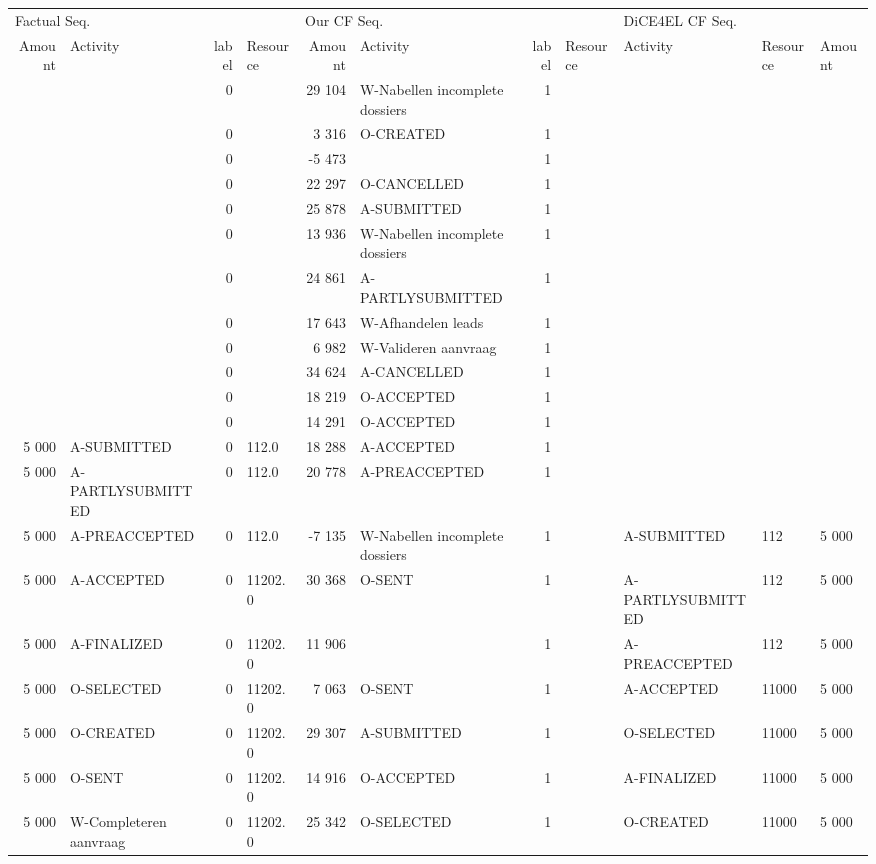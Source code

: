 \begin{tabular}{rlrlrlrllll}
\toprule
\multicolumn{4}{l}{Factual Seq.} & \multicolumn{4}{l}{Our CF Seq.} & \multicolumn{3}{l}{DiCE4EL CF Seq.} \\
Amount & Activity & label & Resource & Amount & Activity & label & Resource & Activity & Resource & Amount \\
\midrule
 &  & 0 &  & 29 104 & W-Nabellen incomplete dossiers & 1 &  &  &  &  \\
 &  & 0 &  & 3 316 & O-CREATED & 1 &  &  &  &  \\
 &  & 0 &  & -5 473 &  & 1 &  &  &  &  \\
 &  & 0 &  & 22 297 & O-CANCELLED & 1 &  &  &  &  \\
 &  & 0 &  & 25 878 & A-SUBMITTED & 1 &  &  &  &  \\
 &  & 0 &  & 13 936 & W-Nabellen incomplete dossiers & 1 &  &  &  &  \\
 &  & 0 &  & 24 861 & A-PARTLYSUBMITTED & 1 &  &  &  &  \\
 &  & 0 &  & 17 643 & W-Afhandelen leads & 1 &  &  &  &  \\
 &  & 0 &  & 6 982 & W-Valideren aanvraag & 1 &  &  &  &  \\
 &  & 0 &  & 34 624 & A-CANCELLED & 1 &  &  &  &  \\
 &  & 0 &  & 18 219 & O-ACCEPTED & 1 &  &  &  &  \\
 &  & 0 &  & 14 291 & O-ACCEPTED & 1 &  &  &  &  \\
5 000 & A-SUBMITTED & 0 & 112.0 & 18 288 & A-ACCEPTED & 1 &  &  &  &  \\
5 000 & A-PARTLYSUBMITTED & 0 & 112.0 & 20 778 & A-PREACCEPTED & 1 &  &  &  &  \\
5 000 & A-PREACCEPTED & 0 & 112.0 & -7 135 & W-Nabellen incomplete dossiers & 1 &  & A-SUBMITTED & 112 & 5 000 \\
5 000 & A-ACCEPTED & 0 & 11202.0 & 30 368 & O-SENT & 1 &  & A-PARTLYSUBMITTED & 112 & 5 000 \\
5 000 & A-FINALIZED & 0 & 11202.0 & 11 906 &  & 1 &  & A-PREACCEPTED & 112 & 5 000 \\
5 000 & O-SELECTED & 0 & 11202.0 & 7 063 & O-SENT & 1 &  & A-ACCEPTED & 11000 & 5 000 \\
5 000 & O-CREATED & 0 & 11202.0 & 29 307 & A-SUBMITTED & 1 &  & O-SELECTED & 11000 & 5 000 \\
5 000 & O-SENT & 0 & 11202.0 & 14 916 & O-ACCEPTED & 1 &  & A-FINALIZED & 11000 & 5 000 \\
5 000 & W-Completeren aanvraag & 0 & 11202.0 & 25 342 & O-SELECTED & 1 &  & O-CREATED & 11000 & 5 000 \\

\end{tabular}
